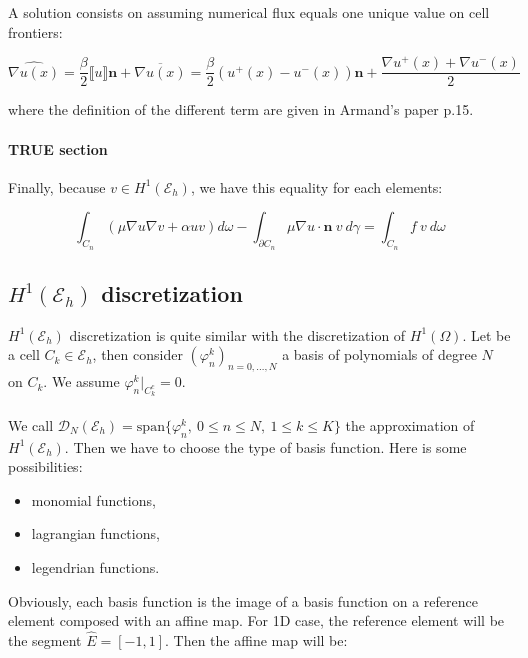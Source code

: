 \documentclass[a4paper,10pt,draft]{article}
\begin{document}
A solution consists on assuming numerical flux equals one unique value on cell frontiers:

$$
\widehat{\nabla u(x)} = \frac{\beta}{2} \llbracket u \rrbracket\mathbf{n} + \overline{\nabla u(x)} 
= \frac{\beta}{2} (u^+(x) - u^-(x)) \mathbf{n} + \frac{\nabla u^+(x) + \nabla u^-(x)}{2}
$$

where the definition of the different term are given in Armand's paper p.15.


\paragraph{TRUE section}
\begin{itshape}
 Finally, because $v \in H^1(\mathcal{E}_h)$, we have this equality for each elements:

$$
\int_{C_n} (\mu \nabla u \nabla v + \alpha uv) d\omega - \int_{\partial C_n} \mu \nabla u \cdot 
\mathbf{n}\ v\ d\gamma = \int_{C_n}  f\ v\ d\omega
$$
\end{itshape}


\subsection{$H^1(\mathcal{E}_h)$ discretization}

 $H^1(\mathcal{E}_h)$ discretization is quite similar with the discretization of $H^1(\Omega)$. Let 
be a cell $C_k \in \mathcal{E}_h$, then consider $(\varphi_n^k)_{n=0,\dots,N}$ a basis of 
polynomials of degree $N$ on $C_k$. We assume $\varphi_n^k|_{C_k^c}=0$.

\paragraph{}
We call $\mathcal{D}_N(\mathcal{E}_h) = \mathrm{span}\{ \varphi_n^k ,\ 0\leq n \leq N,\ 1\leq k 
\leq K \}$ the approximation of $H^1(\mathcal{E}_h)$. Then we have to choose the type of basis 
function. Here is some possibilities:
\begin{itemize}
 \item monomial functions,
 \item lagrangian functions,
 \item legendrian functions.
\end{itemize}

Obviously, each basis function is the image of a basis function on a reference element composed 
with an affine map. For 1D case, the reference element will be the segment $\hat E = [-1,1]$. Then 
the affine map will be:
\end{document}
